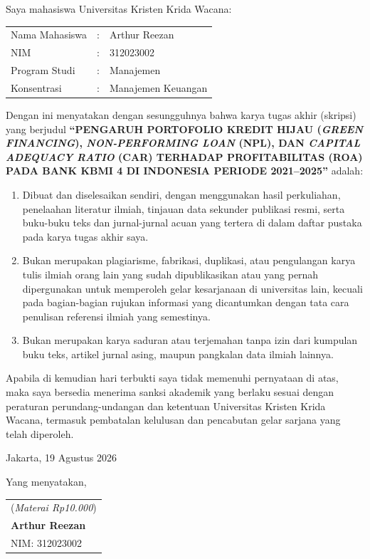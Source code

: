 \documentclass[12pt,a4paper]{article}
\newcommand{\ukrida}{Universitas Kristen Krida Wacana}
\newcommand{\prodi}{Manajemen}
\newcommand{\nahamahasiswa}{Arthur Reezan}
\newcommand{\nim}{312023002}
\newcommand{\judulkapital}{PENGARUH PORTOFOLIO KREDIT HIJAU (\emph{GREEN FINANCING}), \emph{NON-PERFORMING LOAN} (NPL), DAN \emph{CAPITAL ADEQUACY RATIO} (CAR) TERHADAP PROFITABILITAS (ROA) PADA BANK KBMI 4 DI INDONESIA PERIODE 2021--2025}
\numberwithin{equation}{section}
\begin{document}
\vspace{0.8cm}
\noindent Saya mahasiswa \ukrida:

\vspace{0.5cm}
\noindent
\begin{tabular}{lll}
  Nama Mahasiswa & : & \nahamahasiswa \\
  NIM            & : & \nim \\
  Program Studi  & : & \prodi \\
  Konsentrasi    & : & Manajemen Keuangan \\
\end{tabular}

\vspace{0.8cm}
\noindent
Dengan ini menyatakan dengan sesungguhnya bahwa karya tugas akhir (skripsi) yang berjudul \textbf{``\judulkapital''} adalah:

\begin{enumerate}
  \item Dibuat dan diselesaikan sendiri, dengan menggunakan hasil perkuliahan, penelaahan literatur ilmiah, tinjauan data sekunder publikasi resmi, serta buku-buku teks dan jurnal-jurnal acuan yang tertera di dalam daftar pustaka pada karya tugas akhir saya.
  \item Bukan merupakan plagiarisme, fabrikasi, duplikasi, atau pengulangan karya tulis ilmiah orang lain yang sudah dipublikasikan atau yang pernah dipergunakan untuk memperoleh gelar kesarjanaan di universitas lain, kecuali pada bagian-bagian rujukan informasi yang dicantumkan dengan tata cara penulisan referensi ilmiah yang semestinya.
  \item Bukan merupakan karya saduran atau terjemahan tanpa izin dari kumpulan buku teks, artikel jurnal asing, maupun pangkalan data ilmiah lainnya.
\end{enumerate}

\noindent
Apabila di kemudian hari terbukti saya tidak memenuhi pernyataan di atas, maka saya bersedia menerima sanksi akademik yang berlaku sesuai dengan peraturan perundang-undangan dan ketentuan \ukrida, termasuk pembatalan kelulusan dan pencabutan gelar sarjana yang telah diperoleh.

\vspace{1.2cm}
\noindent Jakarta, 19 Agustus 2026

\vspace{0.3cm}
\noindent Yang menyatakan,

\vspace{2.2cm}
\noindent
\begin{tabular}{l}
  (\emph{Materai Rp10.000}) \\[0.2cm]
  \textbf{\nahamahasiswa} \\
  NIM: \nim
\end{tabular}
\end{document}
